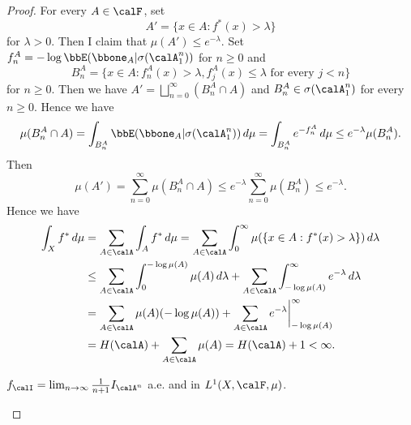 \begin{proof}
    For every $A \in \calF$, set 
    \[ A' = \{x \in A : f^*(x) > \lambda\} \]
    for $\lambda > 0$.
    Then I claim that $\mu(A') \leq e^{-\lambda}$.
    Set $f_n^A = -\log \bbE(\bbone_A | \sigma(\calA^n_1))$ for $n \geq 0$ and 
    \[ B_n^A = \{x \in A : f_n^A(x) > \lambda, f_j^A(x) \leq \lambda \text{ for every } j < n\} \]
    for $n \geq 0$.
    Then we have $A' = \bigsqcup_{n=0}^{\infty} (B_n^A \cap A)$ and $B_n^A \in \sigma(\calA^n_1)$ for every $n \geq 0$.
    Hence we have
    \[ \mu(B_n^A \cap A) = \int_{B_n^A} \bbE(\bbone_A | \sigma(\calA^n_1)) \, d\mu = \int_{B_n^A} e^{-f_n^A} \, d\mu \leq e^{-\lambda} \mu(B_n^A). \]
    Then 
    \[ \mu(A') = \sum_{n=0}^{\infty} \mu(B_n^A \cap A) \leq e^{-\lambda} \sum_{n=0}^{\infty} \mu(B_n^A) \leq e^{-\lambda}. \]
    Hence we have
    \begin{align*}
      \int_X f^* \, d\mu & = \sum_{A \in \calA} \int_A f^* \, d\mu = \sum_{A \in \calA} \int_0^{\infty} \mu(\{x \in A : f^*(x) > \lambda\}) \, d\lambda \\
      & \leq \sum_{A \in \calA} \int_0^{-\log \mu(A)} \mu(A) \, d\lambda + \sum_{A \in \calA} \int_{-\log \mu(A)}^{\infty} e^{-\lambda} \, d\lambda \\
      & = \sum_{A \in \calA} \mu(A) (-\log \mu(A)) + \sum_{A \in \calA} e^{-\lambda} \bigg|_{-\log \mu(A)}^{\infty} \\
      &= H(\calA) + \sum_{A \in \calA} \mu(A) = H(\calA) + 1 < \infty.
    \end{align*}


    \begin{step}
      $f_\calI = \lim_{n \to \infty} \frac{1}{n+1} I_{\calA^n}$ a.e. and in $L^1(X, \calF, \mu)$.
    \end{step}


\end{proof}
